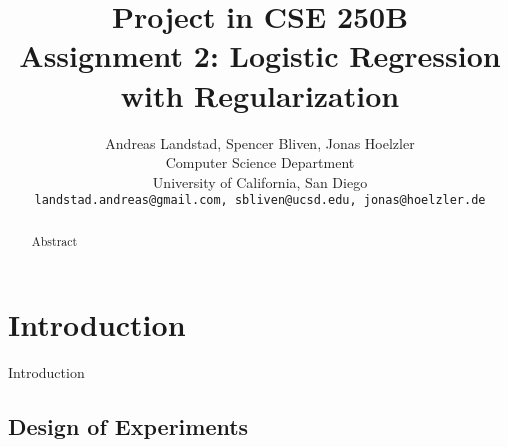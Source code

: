 \documentclass[10pt,twocolumn,letterpaper]{article}
\begin{document}
\title{
Project in CSE 250B\\
Assignment 2: Logistic Regression with Regularization}

\author{Andreas Landstad, Spencer Bliven, Jonas Hoelzler\\
Computer Science Department\\
University of California, San Diego\\
{\tt\small landstad.andreas@gmail.com, sbliven@ucsd.edu, jonas@hoelzler.de}
}%
\maketitle
\thispagestyle{empty}

\begin{abstract}
Abstract
\end{abstract}

\section{Introduction}
Introduction
\subsection{Design of Experiments}
\end{document}
